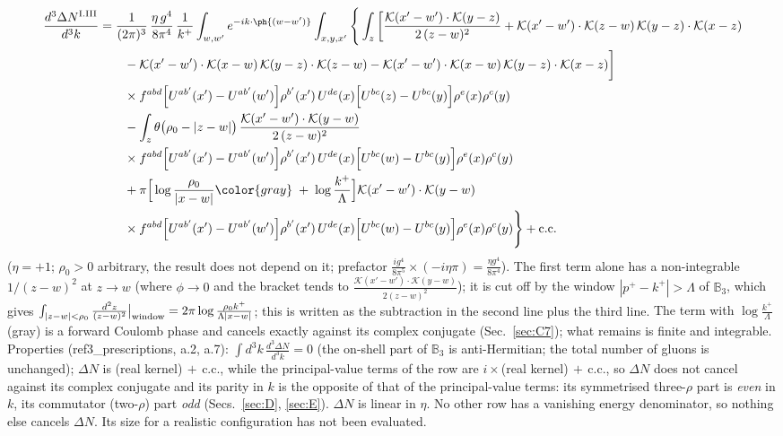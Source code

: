 \begin{align}
\frac{d^{3}\Delta N^{\rm I.III}}{d^{3}k}&=\frac{1}{(2\pi)^{3}}\,\frac{\eta\,g^{4}}{8\pi^{4}}\,\frac{1}{k^{+}}\int_{w,w'}e^{-ik\cdot\ph{(w-w')}}\int_{x,y,x'}\Bigg\{\int_{z}\bigg[\frac{\mathcal{K}(x'-w')\cdot\mathcal{K}(y-z)}{2\,(z-w)^{2}}+\mathcal{K}(x'-w')\cdot\mathcal{K}(z-w)\,\mathcal{K}(y-z)\cdot\mathcal{K}(x-z)\notag\\
&\qquad-\mathcal{K}(x'-w')\cdot\mathcal{K}(x-w)\,\mathcal{K}(y-z)\cdot\mathcal{K}(z-w)-\mathcal{K}(x'-w')\cdot\mathcal{K}(x-w)\,\mathcal{K}(y-z)\cdot\mathcal{K}(x-z)\bigg]\notag\\
&\qquad\times f^{abd}\Big[U^{ab'}(x')-U^{ab'}(w')\Big]\rho^{b'}(x')\,U^{de}(x)\Big[U^{bc}(z)-U^{bc}(y)\Big]\rho^{e}(x)\rho^{c}(y)\notag\\
&\qquad-\int_{z}\theta\big(\rho_{0}-|z-w|\big)\,\frac{\mathcal{K}(x'-w')\cdot\mathcal{K}(y-w)}{2\,(z-w)^{2}}\notag\\
&\qquad\times f^{abd}\Big[U^{ab'}(x')-U^{ab'}(w')\Big]\rho^{b'}(x')\,U^{de}(x)\Big[U^{bc}(w)-U^{bc}(y)\Big]\rho^{e}(x)\rho^{c}(y)\notag\\
&\qquad+\pi\Big[\log\frac{\rho_{0}}{|x-w|}{\color{gray}\;+\;\log\frac{k^{+}}{\Lambda}}\Big]\mathcal{K}(x'-w')\cdot\mathcal{K}(y-w)\notag\\
&\qquad\times f^{abd}\Big[U^{ab'}(x')-U^{ab'}(w')\Big]\rho^{b'}(x')\,U^{de}(x)\Big[U^{bc}(w)-U^{bc}(y)\Big]\rho^{e}(x)\rho^{c}(y)\Bigg\}+{\rm c.c.}\label{eq:B-DN}
\end{align}
($\eta=+1$; $\rho_{0}>0$ arbitrary, the result does not depend on it; prefactor $\frac{ig^{4}}{8\pi^{5}}\times(-i\eta\pi)=\frac{\eta g^{4}}{8\pi^{4}}$). The first term alone has a non-integrable $1/(z-w)^{2}$ at $z\to w$ (where $\phi\to0$ and the bracket tends to $\frac{\mathcal{K}(x'-w')\cdot\mathcal{K}(y-w)}{2(z-w)^{2}}$); it is cut off by the window $|p^{+}-k^{+}|>\Lambda$ of $\mathbb{B}_{3}$, which gives $\int_{|z-w|<\rho_{0}}\frac{d^{2}z}{(z-w)^{2}}\big|_{\rm window}=2\pi\log\frac{\rho_{0}k^{+}}{\Lambda|x-w|}$; this is written as the subtraction in the second line plus the third line. {\color{gray}The term with $\log\frac{k^{+}}{\Lambda}$ (gray) is a forward Coulomb phase and cancels exactly against its complex conjugate (Sec.~\ref{sec:C7})}; what remains is finite and integrable. Properties (ref3\_prescriptions, a.2, a.7): $\int d^{3}k\,\frac{d^{3}\Delta N}{d^{3}k}=0$ (the on-shell part of $\mathbb{B}_{3}$ is anti-Hermitian; the total number of gluons is unchanged); $\Delta N$ is (real kernel)$\,+\,$c.c., while the principal-value terms of the row are $i\times$(real kernel)$\,+\,$c.c., so $\Delta N$ does not cancel against its complex conjugate and its parity in $k$ is the opposite of that of the principal-value terms: its symmetrised three-$\rho$ part is \emph{even} in $k$, its commutator (two-$\rho$) part \emph{odd} (Secs.~\ref{sec:D}, \ref{sec:E}). $\Delta N$ is linear in $\eta$. No other row has a vanishing energy denominator, so nothing else cancels $\Delta N$. Its size for a realistic configuration has not been evaluated.

